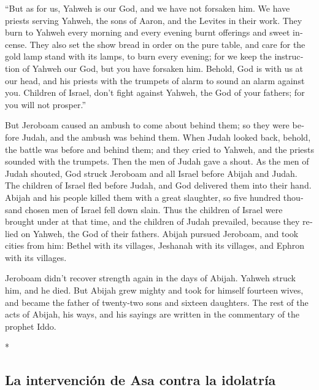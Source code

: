 \begin{paracol}{2}
\begin{otherlanguage}{english}
 ``But as for us, Yahweh is our God, and we have not
forsaken him. We have priests serving Yahweh, the sons of Aaron, and the
Levites in their work.  They burn to Yahweh every morning
and every evening burnt offerings and sweet incense. They also set the
show bread in order on the pure table, and care for the gold lamp stand
with its lamps, to burn every evening; for we keep the instruction of
Yahweh our God, but you have forsaken him.  Behold, God
is with us at our head, and his priests with the trumpets of alarm to
sound an alarm against you. Children of Israel, don't fight against
Yahweh, the God of your fathers; for you will not prosper.''

 But Jeroboam caused an ambush to come about behind them;
so they were before Judah, and the ambush was behind them.
 When Judah looked back, behold, the battle was before
and behind them; and they cried to Yahweh, and the priests sounded with
the trumpets.  Then the men of Judah gave a shout. As the
men of Judah shouted, God struck Jeroboam and all Israel before Abijah
and Judah.  The children of Israel fled before Judah, and
God delivered them into their hand.  Abijah and his
people killed them with a great slaughter, so five hundred thousand
chosen men of Israel fell down slain.  Thus the children
of Israel were brought under at that time, and the children of Judah
prevailed, because they relied on Yahweh, the God of their fathers.
 Abijah pursued Jeroboam, and took cities from him:
Bethel with its villages, Jeshanah with its villages, and Ephron with
its villages.

 Jeroboam didn't recover strength again in the days of
Abijah. Yahweh struck him, and he died.  But Abijah grew
mighty and took for himself fourteen wives, and became the father of
twenty-two sons and sixteen daughters.  The rest of the
acts of Abijah, his ways, and his sayings are written in the commentary
of the prophet Iddo.

\end{otherlanguage}

\switchcolumn[0]*

\hypertarget{la-intervenciuxf3n-de-asa-contra-la-idolatruxeda}{%
\subsection{La intervención de Asa contra la
idolatría}\label{la-intervenciuxf3n-de-asa-contra-la-idolatruxeda}}


\end{paracol}
